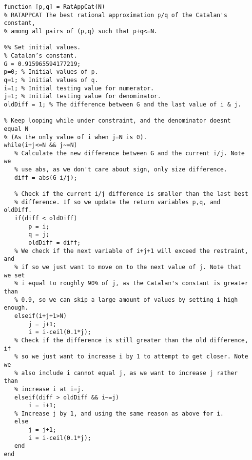 \documentclass[12pt]{article}
\begin{document}
\begin{lstlisting}[caption={Complete Matlab code for Catalan's constant},label={M2_Complete}]
function [p,q] = RatAppCat(N)
% RATAPPCAT The best rational approximation p/q of the Catalan's constant,
% among all pairs of (p,q) such that p+q<=N.

%% Set initial values.
% Catalan’s constant.
G = 0.915965594177219;
p=0; % Initial values of p.
q=1; % Initial values of q.
i=1; % Initial testing value for numerator.
j=1; % Initial testing value for denominator.
oldDiff = 1; % The difference between G and the last value of i & j.

% Keep looping while under constraint, and the denominator doesnt equal N
% (As the only value of i when j=N is 0).
while(i+j<=N && j~=N)
   % Calculate the new difference between G and the current i/j. Note we
   % use abs, as we don't care about sign, only size difference.
   diff = abs(G-i/j);

   % Check if the current i/j difference is smaller than the last best
   % difference. If so we update the return variables p,q, and oldDiff.
   if(diff < oldDiff)
       p = i;
       q = j;
       oldDiff = diff;
   % We check if the next variable of i+j+1 will exceed the restraint, and
   % if so we just want to move on to the next value of j. Note that we set
   % i equal to roughly 90% of j, as the Catalan's constant is greater than
   % 0.9, so we can skip a large amount of values by setting i high enough.
   elseif(i+j+1>N)
       j = j+1;
       i = i-ceil(0.1*j);
   % Check if the difference is still greater than the old difference, if
   % so we just want to increase i by 1 to attempt to get closer. Note we
   % also include i cannot equal j, as we want to increase j rather than
   % increase i at i=j.
   elseif(diff > oldDiff && i~=j)
       i = i+1;
   % Increase j by 1, and using the same reason as above for i.
   else
       j = j+1;
       i = i-ceil(0.1*j);
   end
end

\end{lstlisting}
\end{document}
